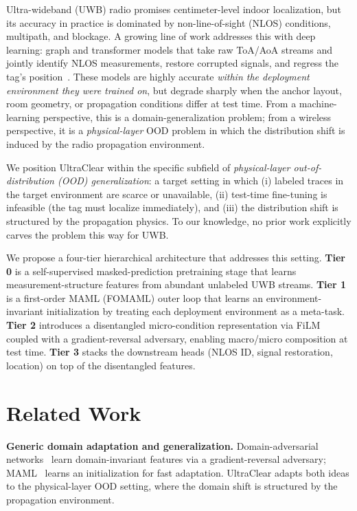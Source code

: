 \documentclass[11pt,letterpaper]{article}
\begin{document}
Ultra-wideband (UWB) radio promises centimeter-level indoor
localization, but its accuracy in practice is dominated by
non-line-of-sight (NLOS) conditions, multipath, and blockage.
A growing line of work addresses this with deep learning:
graph and transformer models that take raw ToA/AoA streams and
jointly identify NLOS measurements, restore corrupted signals, and
regress the tag's position~\cite{hsml2025, fbert2025, refloc2024,
transformerwls2025, adcnnbilstm2025}. These models are highly
accurate \emph{within the deployment environment they were trained
on}, but degrade sharply when the anchor layout, room geometry,
or propagation conditions differ at test time. From a
machine-learning perspective, this is a domain-generalization
problem; from a wireless perspective, it is a
\emph{physical-layer} OOD problem in which the distribution
shift is induced by the radio propagation environment.

We position UltraClear within the specific subfield of
\emph{physical-layer out-of-distribution (OOD) generalization}:
a target setting in which (i) labeled traces in the target
environment are scarce or unavailable, (ii) test-time
fine-tuning is infeasible (the tag must localize immediately),
and (iii) the distribution shift is structured by the
propagation physics. To our knowledge, no prior work
explicitly carves the problem this way for UWB.

We propose a four-tier hierarchical architecture that addresses
this setting. \textbf{Tier 0} is a self-supervised masked-prediction
pretraining stage that learns measurement-structure features
from abundant unlabeled UWB streams. \textbf{Tier 1} is a
first-order MAML (FOMAML) outer loop that learns an
environment-invariant initialization by treating each
deployment environment as a meta-task. \textbf{Tier 2}
introduces a disentangled micro-condition representation via
FiLM coupled with a gradient-reversal adversary, enabling
macro/micro composition at test time. \textbf{Tier 3} stacks
the downstream heads (NLOS ID, signal restoration, location)
on top of the disentangled features.

\section{Related Work}
\label{sec:related}

\textbf{Generic domain adaptation and generalization.}
Domain-adversarial networks~\cite{dann2016} learn
domain-invariant features via a gradient-reversal adversary;
MAML~\cite{maml2017} learns an initialization for fast
adaptation. UltraClear adapts both ideas to the
physical-layer OOD setting, where the domain shift is
structured by the propagation environment.
\end{document}
